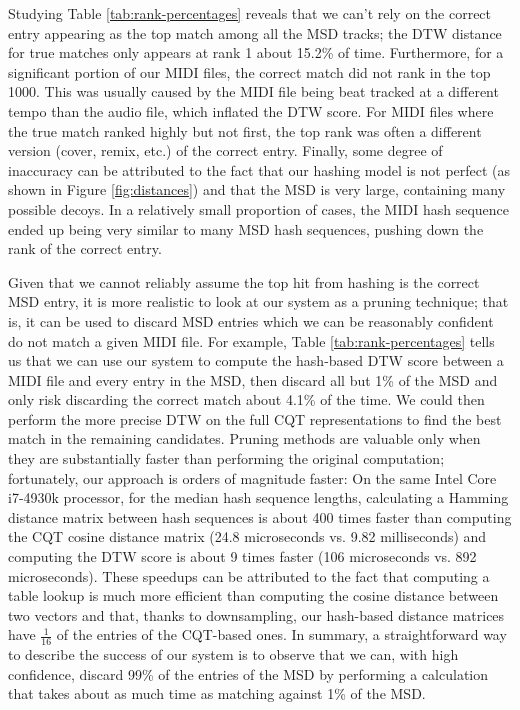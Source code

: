 \documentclass{article}
\begin{document}
Studying Table \ref{tab:rank-percentages} reveals that we can't rely on the correct entry appearing as the top match among all the MSD tracks; the DTW distance for true matches only appears at rank 1 about 15.2\% of time.
Furthermore, for a significant portion of our MIDI files, the correct match did not rank in the top 1000.
This was usually caused by the MIDI file being beat tracked at a different tempo than the audio file, which inflated the DTW score.
For MIDI files where the true match ranked highly but not first, the top rank was often a different version (cover, remix, etc.) of the correct entry.
Finally, some degree of inaccuracy can be attributed to the fact that our hashing model is not perfect (as shown in Figure \ref{fig:distances}) and that the MSD is very large, containing many possible decoys. 
In a relatively small proportion of cases, the MIDI hash sequence ended up being very similar to many MSD hash sequences, pushing down the rank of the correct entry.

Given that we cannot reliably assume the top hit from hashing is the correct MSD entry, it is more realistic to look at our system as a pruning technique; that is, it can be used to discard MSD entries which we can be reasonably confident do not match a given MIDI file.
For example, Table \ref{tab:rank-percentages} tells us that we can use our system to compute the hash-based DTW score between a MIDI file and every entry in the MSD, then discard all but 1\% of the MSD and only risk discarding the correct match about 4.1\% of the time.
We could then perform the more precise DTW on the full CQT representations to find the best match in the remaining candidates.
Pruning methods are valuable only when they are substantially faster than performing the original computation; fortunately, our approach is orders of magnitude faster:
On the same Intel Core i7-4930k processor, for the median hash sequence lengths, calculating a Hamming distance matrix between hash sequences is about 400 times faster than computing the CQT cosine distance matrix (24.8 microseconds vs. 9.82 milliseconds) and computing the DTW score is about 9 times faster (106 microseconds vs. 892 microseconds).
These speedups can be attributed to the fact that computing a table lookup is much more efficient than computing the cosine distance between two vectors and that, thanks to downsampling, our hash-based distance matrices have $\frac{1}{16}$ of the entries of the CQT-based ones.
In summary, a straightforward way to describe the success of our system is to observe that we can, with high confidence, discard 99\% of the entries of the MSD by performing a calculation that takes about as much time as matching against 1\% of the MSD.
\end{document}
